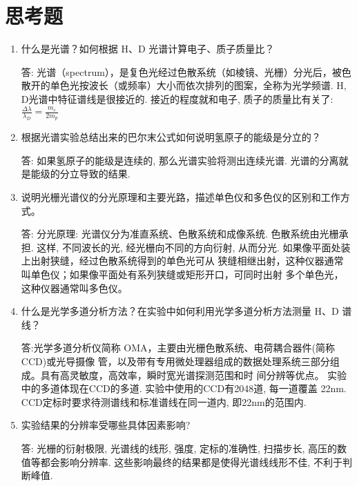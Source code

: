 \documentclass[12pt,a4paper]{article}
\begin{document}
\section{思考题}
\begin{enumerate}
    \item 什么是光谱？如何根据 H、D 光谱计算电子、质子质量比？
    
    答: 光谱（spectrum），是复色光经过色散系统（如棱镜、光栅）分光后，被色散开的单色光按波长（或频率）大小而依次排列的图案，全称为光学频谱. 
    H, D光谱中特征谱线是很接近的. 接近的程度就和电子, 质子的质量比有关了: 
    $\frac{\Delta \lambda}{\lambda_{D}}=\frac{m_e}{2m_p}$
    \item 根据光谱实验总结出来的巴尔末公式如何说明氢原子的能级是分立的？
    
    答: 如果氢原子的能级是连续的, 那么光谱实验将测出连续光谱. 光谱的分离就是能级的分立导致的结果. 

    \item 说明光栅光谱仪的分光原理和主要光路，描述单色仪和多色仪的区别和工作方式。
    
    答: 分光原理: 光谱仪分为准直系统、色散系统和成像系统. 色散系统由光栅承担. 这样, 不同波长的光, 经光栅向不同的方向衍射, 从而分光. 
    如果像平面处装上出射狭缝，经过色散系统得到的单色光可从
    狭缝相继出射，这种仪器通常叫单色仪；如果像平面处有系列狭缝或矩形开口，可同时出射
    多个单色光，这种仪器通常叫多色仪。

    \item 什么是光学多道分析方法？在实验中如何利用光学多道分析方法测量 H、D 谱线？
    
    答:光学多道分析仪简称 OMA，主要由光栅色散系统、电荷耦合器件(简称 CCD)或光导摄像
    管，以及带有专用微处理器组成的数据处理系统三部分组成。具有高灵敏度，高效率，瞬时宽光谱探测范围和时
    间分辨等优点。
    实验中的多道体现在CCD的多道. 实验中使用的CCD有2048道, 每一道覆盖 22nm. CCD定标时要求待测谱线和标准谱线在同一道内, 即22nm的范围内. 
    \item 实验结果的分辨率受哪些具体因素影响?
    
    答: 光栅的衍射极限, 光谱线的线形, 强度, 定标的准确性, 扫描步长, 高压的数值等都会影响分辨率. 这些影响最终的结果都是使得光谱线线形不佳, 不利于判断峰值. 
\end{enumerate}
\end{document}
